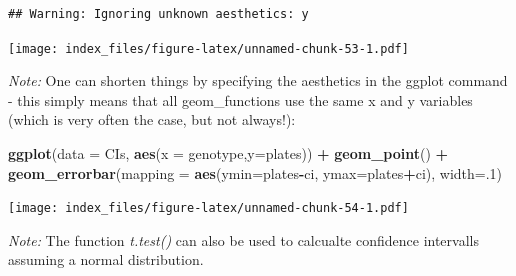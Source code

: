 \documentclass[]{article}
\newenvironment{Shaded}{\begin{snugshade}}{\end{snugshade}}
\newcommand{\DataTypeTok}[1]{\textcolor[rgb]{0.13,0.29,0.53}{#1}}
\newcommand{\DecValTok}[1]{\textcolor[rgb]{0.00,0.00,0.81}{#1}}
\newcommand{\KeywordTok}[1]{\textcolor[rgb]{0.13,0.29,0.53}{\textbf{#1}}}
\newcommand{\NormalTok}[1]{#1}
\newcommand{\OperatorTok}[1]{\textcolor[rgb]{0.81,0.36,0.00}{\textbf{#1}}}
\newcommand{\StringTok}[1]{\textcolor[rgb]{0.31,0.60,0.02}{#1}}
\begin{document}
\begin{verbatim}
## Warning: Ignoring unknown aesthetics: y
\end{verbatim}

\texttt{[image: index\_files/figure-latex/unnamed-chunk-53-1.pdf]}

\emph{Note:} One can shorten things by specifying the aesthetics in the
ggplot command - this simply means that all geom\_functions use the same
x and y variables (which is very often the case, but not always!):

\begin{Shaded}
\begin{Highlighting}[]
\KeywordTok{ggplot}\NormalTok{(}\DataTypeTok{data =}\NormalTok{ CIs, }\KeywordTok{aes}\NormalTok{(}\DataTypeTok{x =}\NormalTok{ genotype,}\DataTypeTok{y=}\NormalTok{plates)) }\OperatorTok{+}
\StringTok{  }\KeywordTok{geom_point}\NormalTok{() }\OperatorTok{+}
\StringTok{  }\KeywordTok{geom_errorbar}\NormalTok{(}\DataTypeTok{mapping =} \KeywordTok{aes}\NormalTok{(}\DataTypeTok{ymin=}\NormalTok{plates}\OperatorTok{-}\NormalTok{ci, }\DataTypeTok{ymax=}\NormalTok{plates}\OperatorTok{+}\NormalTok{ci), }\DataTypeTok{width=}\NormalTok{.}\DecValTok{1}\NormalTok{) }
\end{Highlighting}
\end{Shaded}

\texttt{[image: index\_files/figure-latex/unnamed-chunk-54-1.pdf]}

\emph{Note:} The function \emph{t.test()} can also be used to calcualte
confidence intervalls assuming a normal distribution.
\end{document}
